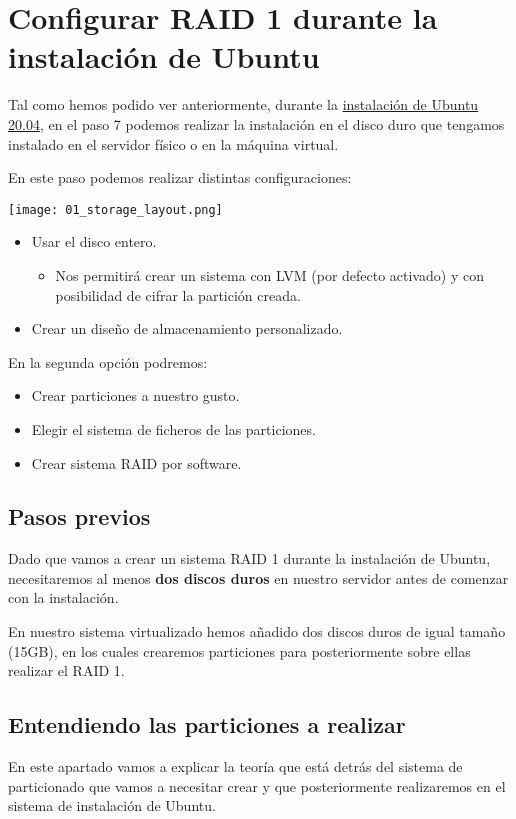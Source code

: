 \chapter{Configurar RAID 1 durante la instalación de Ubuntu}

Tal como hemos podido ver anteriormente, durante la \hyperlink{instalar_ubuntu_lts}{instalación de Ubuntu 20.04}, en el paso 7 podemos realizar la instalación en el disco duro que tengamos instalado en el servidor físico o en la máquina virtual.

En este paso podemos realizar distintas configuraciones:

\begin{center}
    \texttt{[image: 01\_storage\_layout.png]}
\end{center}

\begin{itemize}
    \item Usar el disco entero.
    \begin{itemize}
        \item Nos permitirá crear un sistema con LVM (por defecto activado) y con posibilidad de cifrar la partición creada.
    \end{itemize}
    \item Crear un diseño de almacenamiento personalizado.
\end{itemize}

    En la segunda opción podremos:
\begin{itemize}
    \item  Crear particiones a nuestro gusto.
    \item  Elegir el sistema de ficheros de las particiones.
    \item  Crear sistema RAID por software.
\end{itemize}


\section{Pasos previos}
Dado que vamos a crear un sistema RAID 1 durante la instalación de Ubuntu, necesitaremos al menos \textbf{dos discos duros} en nuestro servidor antes de comenzar con la instalación.

En nuestro sistema virtualizado hemos añadido dos discos duros de igual tamaño (15GB), en los cuales crearemos particiones para posteriormente sobre ellas realizar el RAID 1.

\section{Entendiendo las particiones a realizar}
En este apartado vamos a explicar la teoría que está detrás del sistema de particionado que vamos a necesitar crear y que posteriormente realizaremos en el sistema de instalación de Ubuntu.

